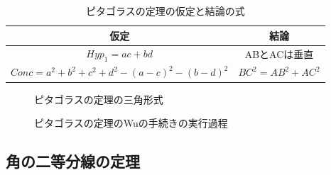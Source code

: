 \documentclass[dvipdfmx]{jsarticle}
\begin{document}
        
        \begin{table}[H]
            \label{table:PythagorasAssumption}
            \centering
            \caption{ピタゴラスの定理の仮定と結論の式}
            \begin{tabular}{cc}
                仮定 & 結論 \\
                \hline \hline
                $Hyp_{1} = a c + b d$ & ABとACは垂直\\
                $Conc =a^{2} + b^{2} + c^{2} + d^{2} - \left(a - c\right)^{2} - \left(b - d\right)^{2}$ & $BC^2=AB^2+AC^2$ \\
            \end{tabular}
        \end{table}

        \begin{figure}[H]
            \centering
            \label{fig:PythagorasTri}
            \caption{ピタゴラスの定理の三角形式}
        \end{figure}

        \begin{figure}[H]
            \centering
            \label{fig:PythagorasWu}
            \caption{ピタゴラスの定理のWuの手続きの実行過程}            
        \end{figure}

    \subsection{角の二等分線の定理}
\end{document}
